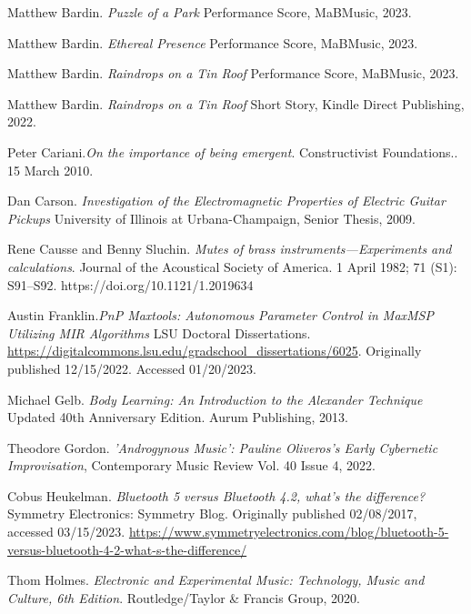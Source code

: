 \begin{thebibliography}{99} %

 Matthew Bardin. \emph{Puzzle of a Park} Performance Score, MaBMusic, 2023.

 Matthew Bardin. \emph{Ethereal Presence} Performance Score, MaBMusic, 2023.

 Matthew Bardin. \emph{Raindrops on a Tin Roof} Performance Score, MaBMusic, 2023.

 Matthew Bardin. \emph{Raindrops on a Tin Roof} Short Story, Kindle Direct Publishing, 2022.

 Peter Cariani.\emph{On the importance of being emergent}. Constructivist Foundations.. 15 March 2010.

 Dan Carson. \emph{Investigation of the Electromagnetic Properties of Electric Guitar Pickups} University of Illinois at Urbana-Champaign, Senior Thesis, 2009.

 Rene Causse and Benny Sluchin. \emph{Mutes of brass instruments—Experiments and calculations}. Journal of the Acoustical Society of America. 1 April 1982; 71 (S1): S91–S92. https://doi.org/10.1121/1.2019634

 Austin Franklin.\emph{PnP Maxtools: Autonomous Parameter Control in MaxMSP Utilizing MIR Algorithms} LSU Doctoral Dissertations.
\url{https://digitalcommons.lsu.edu/gradschool_dissertations/6025}. Originally published 12/15/2022. Accessed 01/20/2023.

 Michael Gelb. \emph{Body Learning: An Introduction to the Alexander Technique} Updated 40th Anniversary Edition. Aurum Publishing, 2013.

 Theodore Gordon. \emph{'Androgynous Music': Pauline Oliveros's Early Cybernetic Improvisation}, Contemporary Music Review Vol. 40 Issue 4, 2022.

 Cobus Heukelman. \emph{Bluetooth 5 versus Bluetooth 4.2, what’s the difference?} Symmetry Electronics: Symmetry Blog. Originally published 02/08/2017, accessed 03/15/2023. \url{https://www.symmetryelectronics.com/blog/bluetooth-5-versus-bluetooth-4-2-what-s-the-difference/}

 Thom Holmes. \emph{Electronic and Experimental Music: Technology, Music and Culture, 6th Edition}. Routledge/Taylor \& Francis Group, 2020.


\end{thebibliography}
